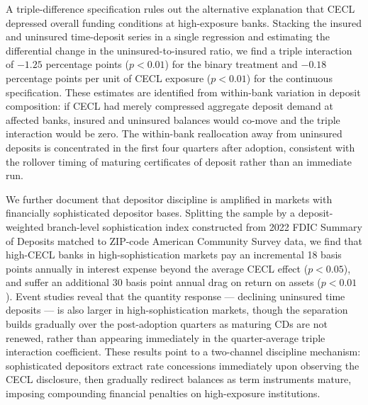 A triple-difference specification rules out the alternative explanation that CECL
depressed overall funding conditions at high-exposure banks. Stacking the insured
and uninsured time-deposit series in a single regression and estimating the
differential change in the uninsured-to-insured ratio, we find a triple
interaction of $-1.25$ percentage points ($p < 0.01$) for the binary treatment
and $-0.18$ percentage points per unit of CECL exposure ($p < 0.01$) for the
continuous specification. These estimates are identified from within-bank
variation in deposit composition: if CECL had merely compressed aggregate deposit
demand at affected banks, insured and uninsured balances would co-move and the
triple interaction would be zero. The within-bank reallocation away from uninsured
deposits is concentrated in the first four quarters after adoption, consistent
with the rollover timing of maturing certificates of deposit rather than an
immediate run.

We further document that depositor discipline is amplified in markets with
financially sophisticated depositor bases. Splitting the sample by a
deposit-weighted branch-level sophistication index constructed from 2022 FDIC
Summary of Deposits matched to ZIP-code American Community Survey data, we find
that high-CECL banks in high-sophistication markets pay an incremental 18 basis
points annually in interest expense beyond the average CECL effect ($p < 0.05$),
and suffer an additional 30 basis point annual drag on return on assets ($p <
0.01$). Event studies reveal that the quantity response --- declining uninsured
time deposits --- is also larger in high-sophistication markets, though the
separation builds gradually over the post-adoption quarters as maturing CDs are
not renewed, rather than appearing immediately in the quarter-average triple
interaction coefficient. These results point to a two-channel discipline
mechanism: sophisticated depositors extract rate concessions immediately upon
observing the CECL disclosure, then gradually redirect balances as term
instruments mature, imposing compounding financial penalties on high-exposure
institutions.

